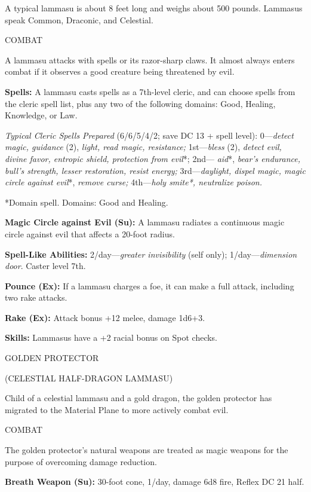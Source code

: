 \documentclass{article}
\begin{document}
A typical lammasu is about 8 feet long and weighs about 500 pounds. Lammasus speak 
Common, Draconic, and Celestial.

COMBAT

A lammasu attacks with spells or its razor-sharp claws. It almost always enters 
combat if it observes a good creature being threatened by evil.

\textbf{Spells:} A lammasu casts spells as a 7th-level cleric, and can choose spells 
from the cleric spell list, plus any two of the following domains: Good, Healing, 
Knowledge, or Law.

\textit{Typical Cleric Spells Prepared }(6/6/5/4/2; save DC 13 + spell level): 
0---\textit{detect magic, guidance }(2), \textit{light, read magic, resistance; 
}1st---\textit{bless }(2), \textit{detect evil, divine favor, entropic shield, 
protection from evil}*; 2nd--- \textit{aid}*, \textit{bear's endurance, bull's 
strength, lesser restoration, resist energy; }3rd---\textit{daylight, dispel magic, 
magic circle against evil}*, \textit{remove curse; }4th---\textit{holy smite*, 
neutralize poison.}

*Domain spell. Domains: Good and Healing.

\textbf{Magic Circle against Evil (Su):} A lammasu radiates a continuous magic 
circle against evil that affects a 20-foot radius.

\textbf{Spell-Like Abilities:} 2/day---\textit{greater invisibility }(self only); 
1/day---\textit{dimension door}. Caster level 7th.

\textbf{Pounce (Ex):} If a lammasu charges a foe, it can make a full attack, including 
two rake attacks.

\textbf{Rake (Ex):} Attack bonus +12 melee, damage 1d6+3.

\textbf{Skills:} Lammasus have a +2 racial bonus on Spot checks.

\vspace{12pt}
GOLDEN PROTECTOR

(CELESTIAL HALF-DRAGON LAMMASU)

Child of a celestial lammasu and a gold dragon, the golden protector has migrated 
to the Material Plane to more actively combat evil.

COMBAT

The golden protector's natural weapons are treated as magic weapons for the purpose 
of overcoming damage reduction.

\textbf{Breath Weapon (Su):} 30-foot cone, 1/day, damage 6d8 fire, Reflex DC 21 
half.
\end{document}
